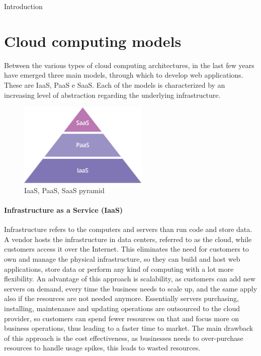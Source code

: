 \begin{chapter}{Introduction}
    \label{chap:intro}

    \section{Cloud computing models}
    Between the various types of cloud computing architectures, in the last few years have
    emerged three main models, through which to develop web applications. These are IaaS,
    PaaS e SaaS.
    Each of the models is characterized by an increasing level of abstraction regarding
    the underlying infrastructure.

    \begin{figure}
        \centering
        \includegraphics[height=4cm]{source/images/saas-paas-iaas-cloud-pyramid.png}
        \caption{IaaS, PaaS, SaaS pyramid}
        \label{fig:cloud_computing_pyramid}
    \end{figure}

    \paragraph{Infrastructure as a Service (IaaS)}
    Infrastructure refers to the computers and servers than run code and store data. A
    vendor hosts the infrastructure in data centers, referred to as the cloud, while
    customers access it over the Internet. This eliminates the need for customers to own
    and manage the physical infrastructure, so they can build and host web applications,
    store data or perform any kind of computing with a lot more flexibility.
    An advantage of this approach is scalability, as customers can add new servers on demand,
    every time the business needs to scale up, and the same apply also if the resources are
    not needed anymore. Essentially servers purchasing, installing, maintenance and updating
    operations are outsourced to the cloud provider, so customers can spend fewer resources
    on that and focus more on business operations, thus leading to a faster time to market.
    The main drawback of this approach is the cost effectiveness, as businesses needs to
    over-purchase resources to handle usage spikes, this leads to wasted resources.


\end{chapter}
